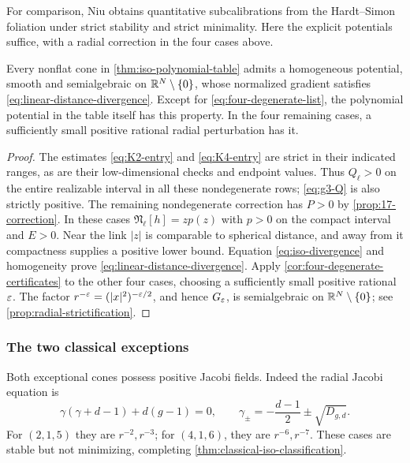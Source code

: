 For comparison, Niu \cite[Lemma~5.3]{Niu26} obtains quantitative
subcalibrations from the Hardt--Simon foliation under strict stability
and strict minimality. Here the explicit
potentials suffice, with a radial correction in the four cases above.

\begin{corollary}
\label{cor:iso-distance-weighted}
Every nonflat cone in \cref{thm:iso-polynomial-table} admits a homogeneous
potential, smooth and semialgebraic on \(\mathbb R^N\setminus\{0\}\), whose
normalized gradient satisfies \eqref{eq:linear-distance-divergence}.
Except for \eqref{eq:four-degenerate-list}, the polynomial potential in the
table itself has this property.  In the four remaining cases, a sufficiently
small positive rational radial perturbation has it.
\end{corollary}

\begin{proof}
The estimates \eqref{eq:K2-entry} and \eqref{eq:K4-entry} are
strict in their indicated ranges, as are their low-dimensional checks and
endpoint values.  Thus \(Q_\ell>0\) on the entire realizable interval in
all these nondegenerate rows; \eqref{eq:g3-Q} is also strictly positive.
The remaining nondegenerate correction has \(P>0\) by
\cref{prop:17-correction}.
In these cases \(\mathfrak N_\ell[h]=z p(z)\) with \(p>0\) on the
compact interval and \(E>0\).  Near the link \(|z|\) is comparable to
spherical distance, and away from it compactness supplies a positive lower
bound.  Equation \eqref{eq:iso-divergence} and homogeneity prove
\eqref{eq:linear-distance-divergence}.
Apply \cref{cor:four-degenerate-certificates} to the other four cases,
choosing a sufficiently small positive rational \(\varepsilon\). The factor
\(r^{-\varepsilon}=(|x|^2)^{-\varepsilon/2}\), and hence \(G_\varepsilon\), is
semialgebraic on \(\mathbb R^N\setminus\{0\}\); see
\cref{prop:radial-strictification}.
\end{proof}

\subsubsection{The two classical exceptions}

Both exceptional cones possess positive Jacobi fields.  Indeed the radial
Jacobi equation is
\begin{equation}\label{eq:iso-radial-Jacobi}
 \gamma(\gamma+d-1)+d(g-1)=0,
\qquad
 \gamma_\pm=-\frac{d-1}{2}\pm\sqrt{D_{g,d}}.
\end{equation}
For \((2,1,5)\) they are \(r^{-2},r^{-3}\); for \((4,1,6)\),
they are \(r^{-6},r^{-7}\). These cases are stable but not minimizing,
completing \cref{thm:classical-iso-classification}.


